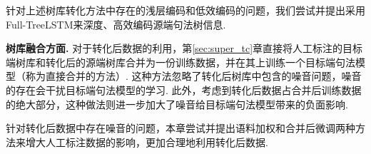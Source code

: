 \begin{enumerate}

\end{enumerate}

针对上述树库转化方法中存在的浅层编码和低效编码的问题，我们尝试并提出采用Full-TreeLSTM来深度、高效编码源端句法树信息.

\textbf{树库融合方面.  } 对于转化后数据的利用，第\ref{sec:super_tc}章直接将人工标注的目标端树库和转化后的源端树库合并为一份训练数据，并在其上训练一个目标端句法模型（称为直接合并的方法）. 这种方法忽略了转化后树库中包含的噪音问题，噪音的存在会干扰目标端句法模型的学习.
此外，考虑到转化后数据占合并后训练数据的绝大部分，这种做法则进一步加大了噪音给目标端句法模型带来的负面影响.

针对转化后数据中存在噪音的问题，本章尝试并提出语料加权和合并后微调两种方法来增大人工标注数据的影响，更加合理地利用转化后数据.

